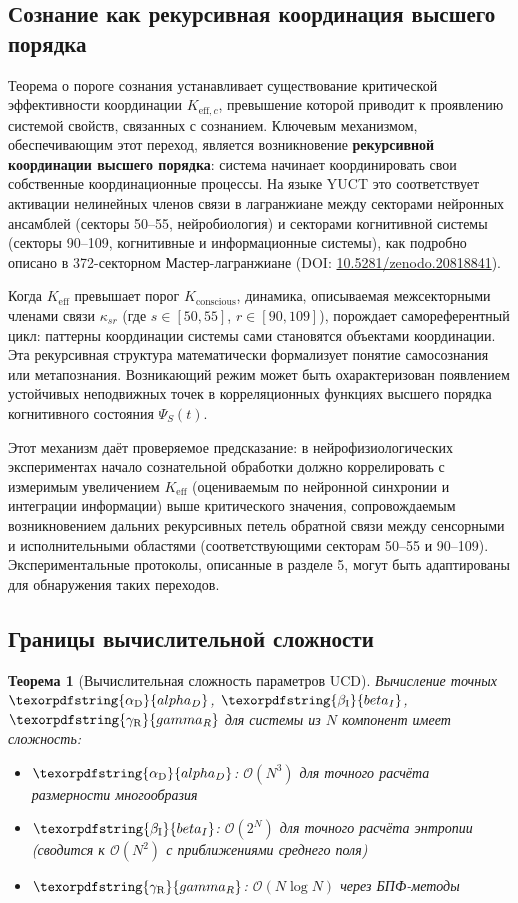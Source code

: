 \documentclass[12pt,a4paper]{article}
\newtheorem{theorem}{Теорема}
\DeclareRobustCommand{\alD}{\texorpdfstring{\ensuremath{\alpha_{\mathrm{D}}}}{alpha_D}}
\DeclareRobustCommand{\beI}{\texorpdfstring{\ensuremath{\beta_{\mathrm{I}}}}{beta_I}}
\DeclareRobustCommand{\gaR}{\texorpdfstring{\ensuremath{\gamma_{\mathrm{R}}}}{gamma_R}}
\newcommand{\eff}{\mathrm{eff}}
\begin{document}
	\subsection{Сознание как рекурсивная координация высшего порядка}
	\label{subsec:recursive-coordination}
	
	Теорема о пороге сознания устанавливает существование критической эффективности координации \(K_{\eff,c}\), превышение которой приводит к проявлению системой свойств, связанных с сознанием. Ключевым механизмом, обеспечивающим этот переход, является возникновение \textbf{рекурсивной координации высшего порядка}: система начинает координировать свои собственные координационные процессы. На языке YUCT это соответствует активации нелинейных членов связи в лагранжиане между секторами нейронных ансамблей (секторы 50--55, нейробиология) и секторами когнитивной системы (секторы 90--109, когнитивные и информационные системы), как подробно описано в 372-секторном Мастер-лагранжиане (DOI: \href{https://doi.org/10.5281/zenodo.20818841}{10.5281/zenodo.20818841}).
	
	Когда \(K_{\eff}\) превышает порог \(K_{\mathrm{conscious}}\), динамика, описываемая межсекторными членами связи \(\kappa_{sr}\) (где \(s\in[50,55]\), \(r\in[90,109]\)), порождает самореферентный цикл: паттерны координации системы сами становятся объектами координации. Эта рекурсивная структура математически формализует понятие самосознания или метапознания. Возникающий режим может быть охарактеризован появлением устойчивых неподвижных точек в корреляционных функциях высшего порядка когнитивного состояния \(\Psi_S(t)\).
	
	Этот механизм даёт проверяемое предсказание: в нейрофизиологических экспериментах начало сознательной обработки должно коррелировать с измеримым увеличением \(K_{\eff}\) (оцениваемым по нейронной синхронии и интеграции информации) выше критического значения, сопровождаемым возникновением дальних рекурсивных петель обратной связи между сенсорными и исполнительными областями (соответствующими секторам 50--55 и 90--109). Экспериментальные протоколы, описанные в разделе 5, могут быть адаптированы для обнаружения таких переходов.
	
	\subsection{Границы вычислительной сложности}
	
	\begin{theorem}[Вычислительная сложность параметров UCD]
		Вычисление точных \(\alD\), \(\beI\), \(\gaR\) для системы из \(N\) компонент имеет сложность:
		\begin{itemize}
			\item \(\alD\): \(\mathcal{O}(N^3)\) для точного расчёта размерности многообразия
			\item \(\beI\): \(\mathcal{O}(2^N)\) для точного расчёта энтропии (сводится к \(\mathcal{O}(N^2)\) с приближениями среднего поля)
			\item \(\gaR\): \(\mathcal{O}(N \log N)\) через БПФ-методы
		\end{itemize}
	\end{theorem}
	
\end{document}
